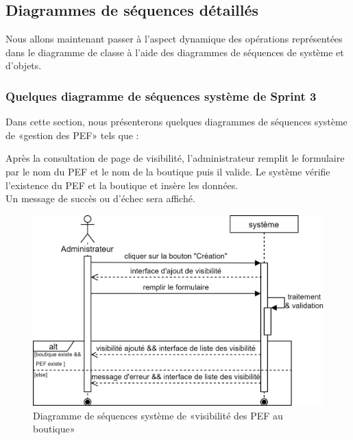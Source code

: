 \subsection{Diagrammes de séquences détaillés}
Nous allons maintenant passer à l’aspect dynamique des opérations représentées dans le diagramme de classe à l’aide des diagrammes de séquences de système et d’objets.
\subsubsection{Quelques diagramme de séquences système de Sprint 3}
Dans cette section, nous présenterons quelques diagrammes de séquences système de «gestion des PEF» tels que : \newpage

Après la consultation de page de visibilité, l'administrateur remplit le formulaire par le nom du PEF et le nom de la boutique puis il valide. Le système vérifie l'existence du PEF et la boutique et insère les données.\\
Un message de succès ou d'échec sera affiché.
	\begin{figure}[H]
		\centering
		\includegraphics[width=0.7\linewidth]{"img/conception/sequences/sprint 3/visibilite-system"}
		\caption[Diagramme de séquences système de «visibilité des PEF au boutique»]{Diagramme de séquences système de «visibilité des PEF au boutique»}
		\label{fig:visibilite-system}
	\end{figure}


